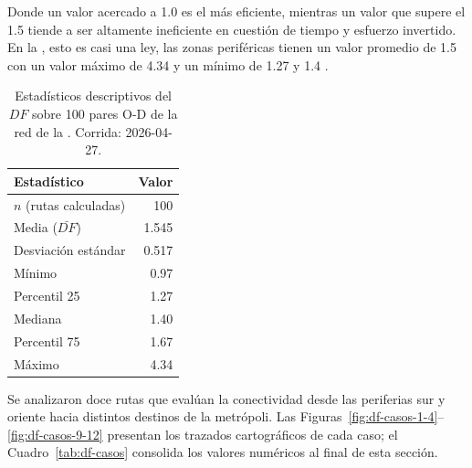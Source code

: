 Donde un valor acercado a 1.0 es el más eficiente, mientras un valor que supere 
el 1.5 tiende a ser altamente ineficiente en cuestión de tiempo y esfuerzo invertido. En la \zmvm, esto es casi una ley, las zonas 
periféricas tienen un valor promedio de 1.5 con un valor máximo de 4.34 y un mínimo de 1.27 y 1.4 \cite{galigaribaldi_vftmodel}.

\begin{table}[H]
    \centering
    \caption[Estadísticos globales del Factor de Desviación — muestra de 100 rutas]{
    Estadísticos descriptivos del $DF$ sobre 100 pares O-D de la red de la \zmvm.
    Corrida: 2026-04-27.}
    \label{tab:df-estadisticas}
    \begin{tabular}{|l|r|}
        \hline
        \textbf{Estadístico} & \textbf{Valor} \\
        \hline
        $n$ (rutas calculadas)     & 100   \\
        Media ($\bar{DF}$)         & 1.545 \\
        Desviación estándar        & 0.517 \\
        Mínimo                     & 0.97  \\
        Percentil 25               & 1.27  \\
        Mediana                    & 1.40  \\
        Percentil 75               & 1.67  \\
        Máximo                     & 4.34  \\
        \hline
    \end{tabular}
\end{table}


Se analizaron doce rutas que evalúan la conectividad desde las periferias sur y
oriente hacia distintos destinos de la metrópoli. Las
Figuras~\ref{fig:df-casos-1-4}--\ref{fig:df-casos-9-12} presentan los trazados
cartográficos de cada caso; el Cuadro~\ref{tab:df-casos} consolida los valores
numéricos al final de esta sección.

